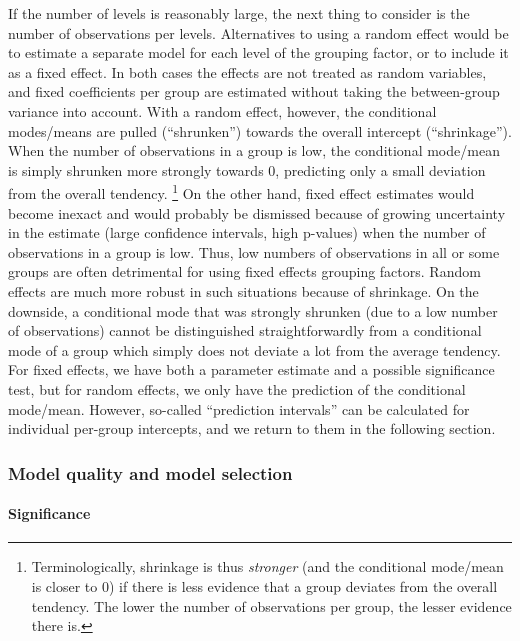 If the number of levels is reasonably large, the next thing to consider is the number of observations per levels.
Alternatives to using a random effect would be to estimate a separate model for each level of the grouping factor, or to include it as a fixed effect.
In both cases the effects are not treated as random variables, and fixed coefficients per group are estimated without taking the between-group variance into account.
With a random effect, however, the conditional modes\slash means are pulled (``shrunken'') towards the overall intercept (``shrinkage'').
When the number of observations in a group is low, the conditional mode\slash mean is simply shrunken more strongly towards $0$, predicting only a small deviation from the overall tendency.%
\footnote{Terminologically, shrinkage is thus \textit{stronger} (and the conditional mode\slash mean is closer to $0$) if there is less evidence that a group deviates from the overall tendency.
The lower the number of observations per group, the lesser evidence there is.}
On the other hand, fixed effect estimates would become inexact and would probably be dismissed because of growing uncertainty in the estimate (large confidence intervals, high p-values) when the number of observations in a group is low.
Thus, low numbers of observations in all or some groups are often detrimental for using fixed effects grouping factors.
Random effects are much more robust in such situations because of shrinkage.
On the downside, a conditional mode that was strongly shrunken (due to a low number of observations) cannot be distinguished straightforwardly from a conditional mode of a group which simply does not deviate a lot from the average tendency.
For fixed effects, we have both a parameter estimate and a possible significance test, but for random effects, we only have the prediction of the conditional mode\slash mean.
However, so-called ``prediction intervals'' can be calculated for individual per-group intercepts, and we return to them in the following section.


\subsubsection{Model quality and model selection}
\label{sec:significancetestingandcoefficientsofdetermination}

\paragraph{Significance}

